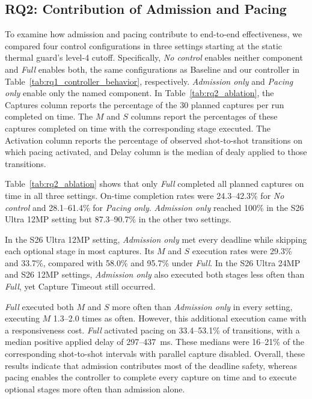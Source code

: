 \subsection{RQ2: Contribution of Admission and Pacing}
\label{sec:rq2}



To examine how admission and pacing contribute to end-to-end effectiveness, we compared four control configurations in three settings starting at the static thermal guard's level-4 cutoff.
Specifically, \emph{No control} enables neither component and \emph{Full} enables both, the same configurations as Baseline and our controller in Table~\ref{tab:rq1_controller_behavior}, respectively.
\emph{Admission only} and \emph{Pacing only} enable only the named component.
In Table~\ref{tab:rq2_ablation}, the Captures column reports the percentage of the 30 planned captures per run completed on time.
The \(M\) and \(S\) columns report the percentages of these captures completed on time with the corresponding stage executed.
The Activation column reports the percentage of observed shot-to-shot transitions on which pacing activated, and Delay column is the median of dealy applied to those transitions.

Table~\ref{tab:rq2_ablation} shows that only \emph{Full} completed all planned captures on time in all three settings.
On-time completion rates were \mbox{24.3--42.3\%} for \emph{No control} and \mbox{28.1--61.4\%} for \emph{Pacing only}.
\emph{Admission only} reached 100\% in the S26 Ultra 12MP setting but 87.3--90.7\% in the other two settings.

In the S26 Ultra 12MP setting, \emph{Admission only} met every deadline while skipping each optional stage in most captures.
Its \(M\) and \(S\) execution rates were 29.3\% and 33.7\%, compared with 58.0\% and 95.7\% under \emph{Full}.
In the S26 Ultra 24MP and S26 12MP settings, \emph{Admission only} also executed both stages less often than \emph{Full}, yet Capture Timeout still occurred.

\emph{Full} executed both \(M\) and \(S\) more often than \emph{Admission only} in every setting, executing \(M\) 1.3--2.0 times as often.
However, this additional execution came with a responsiveness cost.
\emph{Full} activated pacing on 33.4--53.1\% of transitions, with a median positive applied delay of 297--437~ms.
These medians were 16--21\% of the corresponding shot-to-shot intervals with parallel capture disabled.
Overall, these results indicate that admission contributes most of the deadline safety, whereas pacing enables the controller to complete every capture on time and to execute optional stages more often than admission alone.

